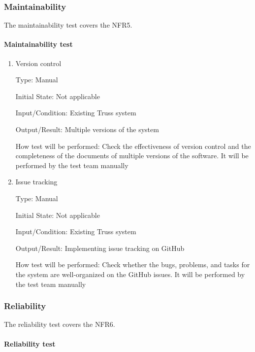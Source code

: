 \documentclass[12pt, titlepage]{article}
\begin{document}
\subsubsection{Maintainability} \label{main}
The maintainability test covers the NFR5.
\paragraph{Maintainability test}

\begin{enumerate}
	
	\item{Version control\\}
	
	Type: Manual
	
	Initial State: Not applicable
	
	Input/Condition: Existing Truss system
	
	Output/Result: Multiple versions of the system
	
	How test will be performed: Check the effectiveness of version control and 
	the completeness of the documents of multiple versions of the software. It 
	will be	performed by the test team manually
	
	\item{Issue tracking\\}
	
	Type: Manual
	
	Initial State: Not applicable
	
	Input/Condition: Existing Truss system
	
	Output/Result: Implementing issue tracking on GitHub
	
	How test will be performed: Check whether the bugs, problems, and tasks for 
	the system are well-organized on the GitHub issues. It will be	performed 
	by the test team manually
	
\end{enumerate}

\subsubsection{Reliability} \label{reliab}
The reliability test covers the NFR6.
\paragraph{Reliability test}
\end{document}
